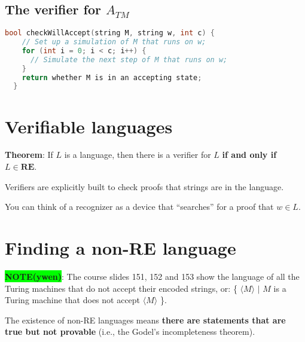 \documentclass[12pt, letterpaper, oneside]{book}
\begin{document}
\subsection{The verifier for $A_{TM}$}

\begin{lstlisting}[language=C++]
  bool checkWillAccept(string M, string w, int c) {
    // Set up a simulation of M that runs on w;
    for (int i = 0; i < c; i++) {
      // Simulate the next step of M that runs on w;
    }
    return whether M is in an accepting state;
  }
\end{lstlisting}

\section{Verifiable languages}

\textbf{Theorem}: If $L$ is a language, then there is a verifier for $L$ \textbf{if and only if} $L \in \mathbf{RE}$.

Verifiers are explicitly built to check proofs that strings are in the language.

You can think of a recognizer as a device that ``searches'' for a proof that $w \in L$.

\section{Finding a non-RE language}

\colorbox{lime}{\textbf{NOTE(ywen)}}: The course slides 151, 152 and 153 show the language of all the Turing machines
that do not accept their encoded strings, or: \{ $\langle M \rangle$ $|$ $M$ is a Turing machine that does not accept
$\langle M \rangle$ \}.

The existence of non-RE languages means \textbf{there are statements that are true but not provable} (i.e., the Godel's
incompleteness theorem).

%
%
\end{document}
